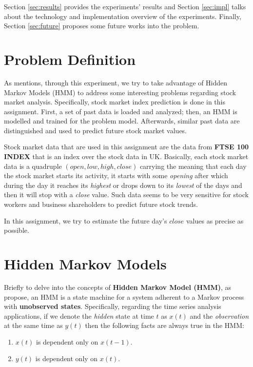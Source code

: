 \documentclass{acm_proc_article-sp}
\begin{document}
Section \ref{sec:results} provides the experiments' results and Section \ref{sec:impl} talks about the technology and
implementation overview of the experiments. Finally, Section \ref{sec:future} proposes some future works into the
problem.

\section{Problem Definition} \label{sec:pdef}
As \cite{erwin:pa4} mentions, through this experiment, we try to take advantage of Hidden Markov Models (HMM) to address
some interesting problems regarding stock market analysis. Specifically, stock market index prediction is done in this
assignment. First, a set of past data is loaded and analyzed; then, an HMM is modelled and trained for the problem
model. Afterwards, similar past data are distinguished and used to predict future stock market values.

Stock market data that are used in this assignment are the data from \textbf{FTSE 100 INDEX} that is an index over the
stock data in UK. Basically, each stock market data is a quadruple $(open, low, high, close)$ carrying the meaning that
each day the stock market starts its activity, it starts with some \textit{opening} after which during the day it
reaches its \textit{highest} or drops down to its \textit{lowest} of the days and then it will stop with a
\textit{close} value. Such data seems to be very sensitive for stock workers and business shareholders to predict
future stock trends.

In this assignment, we try to estimate the future day's $close$ values as precise as possible.

\section{Hidden Markov Models} \label{sec:hmm}
Briefly to delve into the concepts of \textbf{Hidden Markov Model (HMM)}, as 
\cite{hassan:phd_ths,hassan:hmm_stock,blunsom:hmm_tut,wiki:hmm} propose, an HMM is a state machine
for a system adherent to a Markov process with \textbf{unobserved states}. Specifically, regarding
the time series analysis applications, if we denote the \textit{hidden} state at time $t$ as $x(t)$
and the \textit{observation} at the same time as $y(t)$ then the following facts are always true in the HMM:
\begin{enumerate}
  \item $x(t)$ is dependent only on $x(t-1)$.
  \item $y(t)$ is dependent only on $x(t)$.
\end{enumerate}
\end{document}
